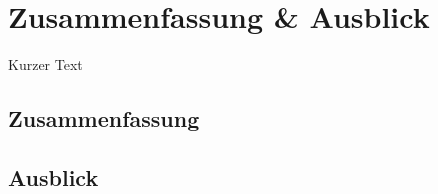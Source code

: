 \chapter{Zusammenfassung \& Ausblick}
\label{cha:zusammenfassungAusblick}
Kurzer Text

\section{Zusammenfassung}
\label{sec:grundlagen:zusammenfassung}

\section{Ausblick}
\label{sec:grundlagen:ausblick}